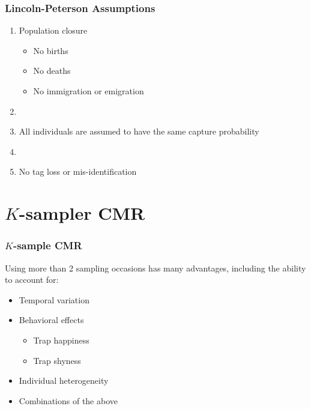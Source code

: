 \documentclass[color=usenames,dvipsnames]{beamer}\usepackage[]{graphicx}\usepackage[]{color}
\begin{document}





\begin{frame}
  \frametitle{Lincoln-Peterson Assumptions}
  \large
  \begin{enumerate}[\bf (1)]
    \item<1-> Population closure
      \begin{itemize}
        \large
        \item No births
        \item No deaths
        \item No immigration or emigration
      \end{itemize}
    \item[]
    \item<2-> All individuals are assumed to have the same capture probability
    \item[]
    \item<3-> No tag loss or mis-identification
  \end{enumerate}
\end{frame}





\section{$K$-sampler CMR}






\begin{frame}
  \frametitle{$K$-sample CMR}
  \large
  Using more than 2 sampling occasions has many advantages, including
  the ability to account for:
  \begin{itemize}[<+->]
    \large
    \item Temporal variation
    \item Behavioral effects
      \begin{itemize}
        \large
        \item Trap happiness
        \item Trap shyness
      \end{itemize}
    \item Individual heterogeneity
    \item Combinations of the above
  \end{itemize}
\end{frame}
\end{document}
